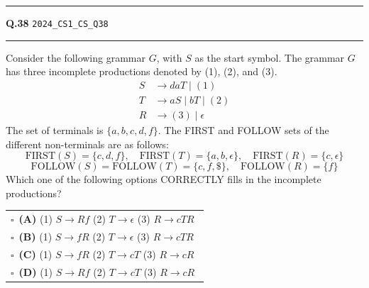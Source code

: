 \documentclass[a4paper,10pt]{article}
\begin{document}
\begin{tcolorbox}
\end{tcolorbox}
\vspace{6pt}\hrule height 0.35pt\vspace{6pt}
\noindent
\begin{tcolorbox}[
    blanker,
    sidebyside,
    sidebyside align=top,
    lefthand width=0.55\textwidth,
    top=4pt, bottom=4pt, left=0pt, right=0pt,
    middle=16pt,
    underlay={
        \draw[dashed, black!80, line width=0.8pt, dash pattern=on 4pt off 3pt]
            ([xshift=0.55\textwidth+8pt]frame.north west) --
            ([xshift=0.55\textwidth+8pt]frame.south west);
    }
]
\textbf{Q.38}  \hfill {\tiny\texttt{2024\_CS1\_CS\_Q38}}
\vspace{2pt}\hrule height 0.3pt\vspace{4pt}

Consider the following grammar $G$, with $S$ as the start symbol. The grammar $G$ has three incomplete productions denoted by (1), (2), and (3).
\begin{align*}
S &\to daT \mid (1) \\
T &\to aS \mid bT \mid (2) \\
R &\to (3) \mid \epsilon
\end{align*}
The set of terminals is $\{a, b, c, d, f\}$. The FIRST and FOLLOW sets of the different non-terminals are as follows:
$$\text{FIRST}(S) = \{c, d, f\}, \quad \text{FIRST}(T) = \{a, b, \epsilon\}, \quad \text{FIRST}(R) = \{c, \epsilon\}$$
$$\text{FOLLOW}(S) = \text{FOLLOW}(T) = \{c, f, \$\}, \quad \text{FOLLOW}(R) = \{f\}$$
Which one of the following options CORRECTLY fills in the incomplete productions?

\par\vspace{6pt}\noindent
\begin{tabular}{@{}p{0.98\linewidth}@{}}
$\square$\ \textbf{(A)} (1) $S \to Rf$ (2) $T \to \epsilon$ (3) $R \to cTR$ \\
\addlinespace[3pt]
$\square$\ \textbf{(B)} (1) $S \to fR$ (2) $T \to \epsilon$ (3) $R \to cTR$ \\
\addlinespace[3pt]
$\square$\ \textbf{(C)} (1) $S \to fR$ (2) $T \to cT$ (3) $R \to cR$ \\
\addlinespace[3pt]
$\square$\ \textbf{(D)} (1) $S \to Rf$ (2) $T \to cT$ (3) $R \to cR$
\end{tabular}

\tcblower


\end{tcolorbox}
\end{document}
